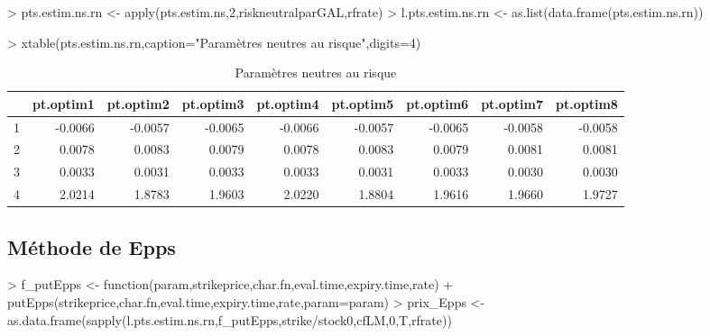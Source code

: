 \documentclass[letter]{report}
\begin{document}
\begin{Schunk}
\begin{Sinput}
> pts.estim.ns.rn <- apply(pts.estim.ns,2,riskneutralparGAL,rfrate)
> l.pts.estim.ns.rn <- as.list(data.frame(pts.estim.ns.rn))
\end{Sinput}
\end{Schunk}

\begin{Schunk}
\begin{Sinput}
> xtable(pts.estim.ns.rn,caption="Paramètres neutres au risque",digits=4)
\end{Sinput}
% latex table generated in R 3.0.3 by xtable 1.7-3 package
% Sat Mar 29 12:42:33 2014
\begin{table}[ht]
\centering
\begin{tabular}{rrrrrrrrr}
  \hline
 & pt.optim1 & pt.optim2 & pt.optim3 & pt.optim4 & pt.optim5 & pt.optim6 & pt.optim7 & pt.optim8 \\ 
  \hline
1 & -0.0066 & -0.0057 & -0.0065 & -0.0066 & -0.0057 & -0.0065 & -0.0058 & -0.0058 \\ 
  2 & 0.0078 & 0.0083 & 0.0079 & 0.0078 & 0.0083 & 0.0079 & 0.0081 & 0.0081 \\ 
  3 & 0.0033 & 0.0031 & 0.0033 & 0.0033 & 0.0031 & 0.0033 & 0.0030 & 0.0030 \\ 
  4 & 2.0214 & 1.8783 & 1.9603 & 2.0220 & 1.8804 & 1.9616 & 1.9660 & 1.9727 \\ 
   \hline
\end{tabular}
\caption{Paramètres neutres au risque} 
\end{table}\end{Schunk}


\subsection{Méthode de Epps}

\begin{Schunk}
\begin{Sinput}
> 	f_putEpps <- function(param,strikeprice,char.fn,eval.time,expiry.time,rate)
+ 		putEpps(strikeprice,char.fn,eval.time,expiry.time,rate,param=param)
> 	prix_Epps <- as.data.frame(sapply(l.pts.estim.ns.rn,f_putEpps,strike/stock0,cfLM,0,T,rfrate))
\end{Sinput}
\end{Schunk}
\end{document}
